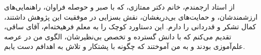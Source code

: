 \begin{acknowledgementpage}

\vspace{1.5cm}

{\nastaliq
{
 از استاد ارجمندم، خانم دکتر ممتازی، که با صبر و حوصله فراوان، راهنمایی‌های ارزشمندشان، و حمایت‌های بی‌دریغشان، نقش بسزایی در موفقیت این پژوهش داشتند، کمال تشکر و قدردانی را دارم.
}
\newpage
{
	این دستاورد کوچک را به معلم فرهیخته‌ام، آقای ساقی، تقدیم می‌کنم که با دانش گسترده و تخصص بی‌نظیرشان، الگوی من در عرصه علم‌آموزی بودند و به من آموختند که چگونه با پشتکار و تلاش به اهدافم دست یابم.
}
}\end{acknowledgementpage}
\newpage